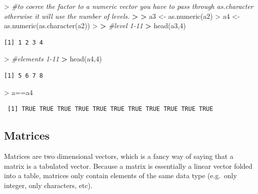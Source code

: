 \documentclass[
]{book}
\newenvironment{Shaded}{\begin{snugshade}}{\end{snugshade}}
\newcommand{\CommentTok}[1]{\textcolor[rgb]{0.56,0.35,0.01}{\textit{#1}}}
\newcommand{\DecValTok}[1]{\textcolor[rgb]{0.00,0.00,0.81}{#1}}
\newcommand{\ErrorTok}[1]{\textcolor[rgb]{0.64,0.00,0.00}{\textbf{#1}}}
\newcommand{\FunctionTok}[1]{\textcolor[rgb]{0.00,0.00,0.00}{#1}}
\newcommand{\NormalTok}[1]{#1}
\newcommand{\OtherTok}[1]{\textcolor[rgb]{0.56,0.35,0.01}{#1}}
\newcommand{\SpecialCharTok}[1]{\textcolor[rgb]{0.00,0.00,0.00}{#1}}
\theoremstyle{definition}
\theoremstyle{definition}
\theoremstyle{definition}
\theoremstyle{definition}
\theoremstyle{remark}
\begin{document}
\begin{Shaded}
\begin{Highlighting}[]
\SpecialCharTok{\textgreater{}} \CommentTok{\#to coerce the factor to a numeric vector you have to pass through as.character otherwise it will use the number of levels.}
\ErrorTok{\textgreater{}} 
\ErrorTok{\textgreater{}}\NormalTok{ a3 }\OtherTok{\textless{}{-}} \FunctionTok{as.numeric}\NormalTok{(a2)}
\SpecialCharTok{\textgreater{}}\NormalTok{ a4 }\OtherTok{\textless{}{-}} \FunctionTok{as.numeric}\NormalTok{(}\FunctionTok{as.character}\NormalTok{(a2))}
\SpecialCharTok{\textgreater{}} 
\ErrorTok{\textgreater{}} \CommentTok{\#level 1{-}11}
\ErrorTok{\textgreater{}} \FunctionTok{head}\NormalTok{(a3,}\DecValTok{4}\NormalTok{)}
\end{Highlighting}
\end{Shaded}

\begin{verbatim}
[1] 1 2 3 4
\end{verbatim}

\begin{Shaded}
\begin{Highlighting}[]
\SpecialCharTok{\textgreater{}} \CommentTok{\#elements 1{-}11}
\ErrorTok{\textgreater{}} \FunctionTok{head}\NormalTok{(a4,}\DecValTok{4}\NormalTok{)}
\end{Highlighting}
\end{Shaded}

\begin{verbatim}
[1] 5 6 7 8
\end{verbatim}

\begin{Shaded}
\begin{Highlighting}[]
\SpecialCharTok{\textgreater{}}\NormalTok{ a}\SpecialCharTok{==}\NormalTok{a4}
\end{Highlighting}
\end{Shaded}

\begin{verbatim}
 [1] TRUE TRUE TRUE TRUE TRUE TRUE TRUE TRUE TRUE TRUE TRUE
\end{verbatim}

\hypertarget{matrices}{%
\subsection*{\texorpdfstring{\textbf{Matrices}}{Matrices}}\label{matrices}}

Matrices are two dimensional vectors, which is a fancy way of saying that a matrix is a tabulated vector. Because a matrix
is essentially a linear vector folded into a table, matrices only contain elements of the same data type (e.g.~only
integer, only characters, etc).
\end{document}
